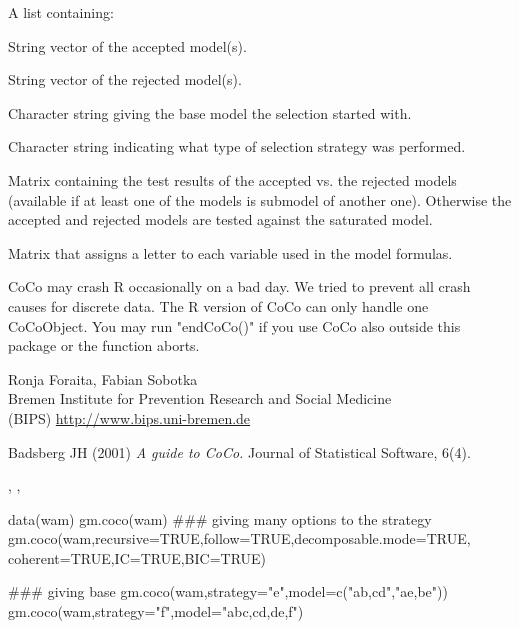 \begin{Value}
A list containing:
\begin{ldescription}
\item[\code{"accepted" }] String vector of the accepted model(s). 
\item[\code{"rejected" }] String vector of the rejected model(s). 
\item[\code{"base"}] Character string giving the base model the selection started with. 
\item[\code{"strategy"}] Character string indicating what type of selection strategy was performed. 
\item[\code{"tests"}] Matrix containing the test results of the accepted vs. the rejected models 
(available if at least one of the models is submodel of another one).
Otherwise the accepted and rejected models are tested against the saturated model. 
\item[\code{"variable names"}] Matrix that assigns a letter to each variable used in the model formulas. 
\end{ldescription}
\end{Value}
\begin{Note}\relax
CoCo may crash R occasionally on a bad day. We tried to prevent all crash causes for discrete data. The R version of CoCo can only handle one CoCoObject.
You may run "endCoCo()" if you use CoCo also outside this package or the function aborts.
\end{Note}
\begin{Author}\relax
Ronja Foraita, Fabian Sobotka \\
Bremen Institute for Prevention Research and Social Medicine \\
(BIPS)  \url{http://www.bips.uni-bremen.de}
\end{Author}
\begin{References}\relax
Badsberg JH (2001)
\emph{A guide to CoCo.}
Journal of Statistical Software, 6(4).
\end{References}
\begin{SeeAlso}\relax
{}, , 
\end{SeeAlso}
\begin{Examples}
\begin{ExampleCode}
  data(wam)
  gm.coco(wam)
  ### giving many options to the strategy
  gm.coco(wam,recursive=TRUE,follow=TRUE,decomposable.mode=TRUE,
            coherent=TRUE,IC=TRUE,BIC=TRUE)
  
  ### giving base
  gm.coco(wam,strategy="e",model=c("ab,cd","ae,be"))
  gm.coco(wam,strategy="f",model="abc,cd,de,f")
\end{ExampleCode}
\end{Examples}

